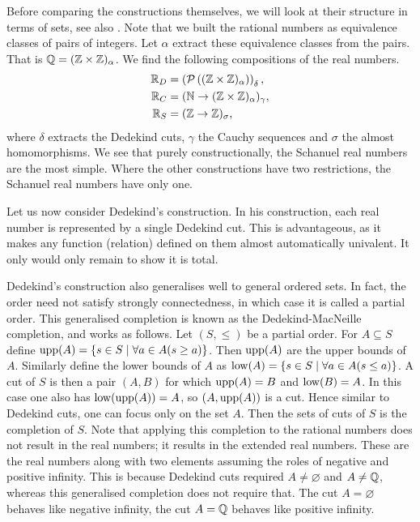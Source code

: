\documentclass[../main.tex]{subfiles}
\begin{document}
Before comparing the constructions themselves, we will look at their structure in terms of sets, see also \cite{Borovik2012}. Note that we built the rational numbers as equivalence classes of pairs of integers. Let $\alpha$ extract these equivalence classes from the pairs. That is $\mathbb{Q}=(\mathbb{Z}\times\mathbb{Z})_\alpha$. We find the following compositions of the real numbers.
\begin{align*}
    \mathbb{R}_D & =\left(\mathcal{P}\left((\mathbb{Z}\times\mathbb{Z})_\alpha\right)\right)_\delta, \\
    \mathbb{R}_C & =(\mathbb{N}\to(\mathbb{Z}\times\mathbb{Z})_\alpha)_\gamma, \\
    \mathbb{R}_S & =(\mathbb{Z}\to\mathbb{Z})_\sigma,
\end{align*}
where $\delta$ extracts the Dedekind cuts, $\gamma$ the Cauchy sequences and $\sigma$ the almost homomorphisms. We see that purely constructionally, the Schanuel real numbers are the most simple. Where the other constructions have two restrictions, the Schanuel real numbers have only one.

Let us now consider Dedekind's construction. In his construction, each real number is represented by a single Dedekind cut. This is advantageous, as it makes any function (relation) defined on them almost automatically univalent. It only would only remain to show it is total. 

Dedekind's construction also generalises well to general ordered sets. In fact, the order need not satisfy strongly connectedness, in which case it is called a partial order. This generalised completion is known as the Dedekind-MacNeille completion, and works as follows. Let $(S,\leq)$ be a partial order. For $A\subseteq S$ define $\operatorname{upp}(A)=\{s\in S\mid\forall a\in A(s\geq a)\}$. Then $\operatorname{upp}(A)$ are the upper bounds of $A$. Similarly define the lower bounds of $A$ as $\operatorname{low}(A)=\{s\in S\mid\forall a\in A(s\leq a)\}$. A cut of $S$ is then a pair $(A,B)$ for which $\operatorname{upp}(A)=B$ and $\operatorname{low}(B)=A$. In this case one also has $\operatorname{low}(\operatorname{upp}(A))=A$, so $(A,\operatorname{upp}(A))$ is a cut. Hence similar to Dedekind cuts, one can focus only on the set $A$. Then the sets of cuts of $S$ is the completion of $S$. Note that applying this completion to the rational numbers does not result in the real numbers; it results in the extended real numbers. These are the real numbers along with two elements assuming the roles of negative and positive infinity. This is because Dedekind cuts required $A\neq\varnothing$ and $A\neq\mathbb{Q}$, whereas this generalised completion does not require that. The cut $A=\varnothing$ behaves like negative infinity, the cut $A=\mathbb{Q}$ behaves like positive infinity.
\end{document}
